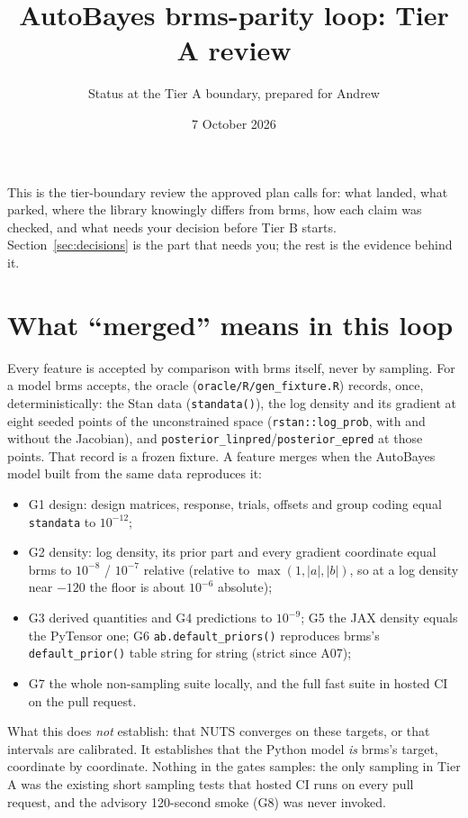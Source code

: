 \documentclass[11pt]{article}
\title{AutoBayes brms-parity loop: Tier A review}
\author{Status at the Tier A boundary, prepared for Andrew}
\date{7 October 2026}
\newcommand{\code}[1]{\texttt{#1}}
\newcommand{\file}[1]{\texttt{#1}}
\begin{document}
\maketitle

\noindent This is the tier-boundary review the approved plan calls for: what landed, what parked, where the library
knowingly differs from brms, how each claim was checked, and what needs your decision before Tier B starts.
Section~\ref{sec:decisions} is the part that needs you; the rest is the evidence behind it.

\section{What ``merged'' means in this loop}
\label{sec:meaning}

Every feature is accepted by comparison with brms itself, never by sampling. For a model brms accepts, the oracle
(\file{oracle/R/gen\_fixture.R}) records, once, deterministically: the Stan data (\code{standata()}), the log density
and its gradient at eight seeded points of the unconstrained space (\code{rstan::log\_prob}, with and without the
Jacobian), and \code{posterior\_linpred}/\code{posterior\_epred} at those points. That record is a frozen fixture. A
feature merges when the AutoBayes model built from the same data reproduces it:

\begin{itemize}
\item G1 design: design matrices, response, trials, offsets and group coding equal \code{standata} to $10^{-12}$;
\item G2 density: log density, its prior part and every gradient coordinate equal brms to $10^{-8}$ / $10^{-7}$
  relative (relative to $\max(1, |a|, |b|)$, so at a log density near $-120$ the floor is about $10^{-6}$ absolute);
\item G3 derived quantities and G4 predictions to $10^{-9}$; G5 the JAX density equals the PyTensor one;
  G6 \code{ab.default\_priors()} reproduces brms's \code{default\_prior()} table string for string (strict since A07);
\item G7 the whole non-sampling suite locally, and the full fast suite in hosted CI on the pull request.
\end{itemize}

\noindent What this does \emph{not} establish: that NUTS converges on these targets, or that intervals are calibrated.
It establishes that the Python model \emph{is} brms's target, coordinate by coordinate. Nothing in the gates samples:
the only sampling in Tier A was the existing short sampling tests that hosted CI runs on every pull request, and the
advisory 120-second smoke (G8) was never invoked.
\end{document}
